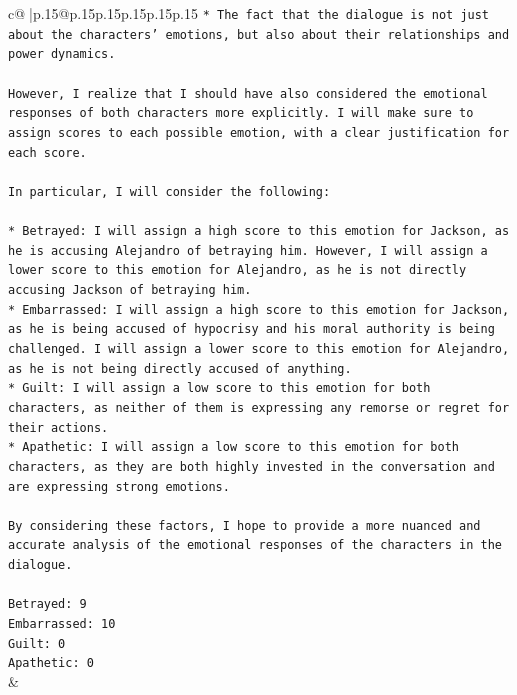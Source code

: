 \documentclass{article}
\begin{document}
{\begin{supertabular}{c@{$\;$}|p{.15\linewidth}@{}p{.15\linewidth}p{.15\linewidth}p{.15\linewidth}p{.15\linewidth}p{.15\linewidth}}
{{{\texttt{* The fact that the dialogue is not just about the characters' emotions, but also about their relationships and power dynamics.} \\
\\ 
\texttt{However, I realize that I should have also considered the emotional responses of both characters more explicitly. I will make sure to assign scores to each possible emotion, with a clear justification for each score.} \\
\\ 
\texttt{In particular, I will consider the following:} \\
\\ 
\texttt{* Betrayed: I will assign a high score to this emotion for Jackson, as he is accusing Alejandro of betraying him. However, I will assign a lower score to this emotion for Alejandro, as he is not directly accusing Jackson of betraying him.} \\
\texttt{* Embarrassed: I will assign a high score to this emotion for Jackson, as he is being accused of hypocrisy and his moral authority is being challenged. I will assign a lower score to this emotion for Alejandro, as he is not being directly accused of anything.} \\
\texttt{* Guilt: I will assign a low score to this emotion for both characters, as neither of them is expressing any remorse or regret for their actions.} \\
\texttt{* Apathetic: I will assign a low score to this emotion for both characters, as they are both highly invested in the conversation and are expressing strong emotions.} \\
\\ 
\texttt{By considering these factors, I hope to provide a more nuanced and accurate analysis of the emotional responses of the characters in the dialogue.} \\
\\ 
\texttt{Betrayed: 9} \\
\texttt{Embarrassed: 10} \\
\texttt{Guilt: 0} \\
\texttt{Apathetic: 0} \\
            }
        }
    }
    & \\ \\

\end{supertabular}
}
\end{document}
